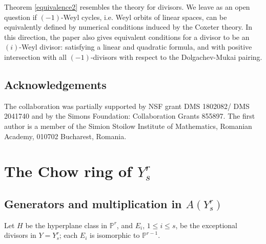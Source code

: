\documentclass[12pt]{article}
\numberwithin{equation}{section}
\newtheorem{proposition}[equation]{Proposition}
\numberwithin{equation}{section}
\numberwithin{subeq}{equation}
\def\bbP{\mathbb{P}}
\def\bbR{\mathbb{R}}
\begin{document}



Theorem \ref{equivalence2} resembles the theory for divisors.
We leave as an open question if $(-1)$-Weyl cycles,
i.e. Weyl orbits of linear spaces,
can be equivalently defined by numerical conditions
induced by the Coxeter theory.
In this direction,
the paper \cite{DP} also gives equivalent conditions
for a divisor to be an $(i)$-Weyl divisor:
satisfying a linear and quadratic formula,
and with positive intersection with all $(-1)$-divisors
with respect to the Dolgachev-Mukai pairing. 

\subsection*{Acknowledgements} 
The collaboration  was partially supported by NSF grant DMS 1802082/ DMS 2041740 and by the Simons Foundation: Collaboration Grants 855897. The first author is a member of the Simion Stoilow Institute of Mathematics, Romanian Academy, 010702 Bucharest, Romania.

\section{The Chow ring of $Y_s^r$}\label{chow section}

\subsection{Generators and multiplication in $A(Y_s^r)$}

Let $H$ be the hyperplane class in $\bbP^r$,
and $E_i$, $1 \leq i \leq s$, be the exceptional divisors in $Y=Y_s^r$;
each $E_i$ is isomorphic to $\bbP^{r-1}$.
\end{document}
